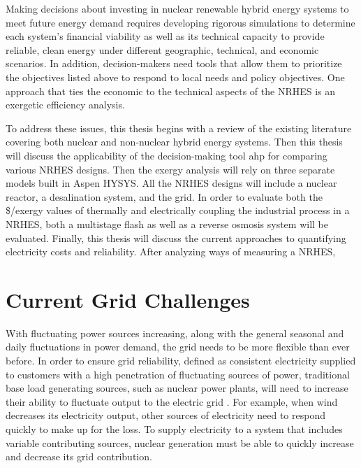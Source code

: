 \documentclass[12pt]{UIdahoMastersThesis}
\begin{document}
Making decisions about investing in nuclear renewable hybrid energy systems to meet future energy demand requires developing rigorous simulations to determine each system's financial viability as well as its technical capacity to provide reliable, clean energy under different geographic, technical, and economic scenarios. In addition, decision-makers need tools that allow them to prioritize the objectives listed above to respond to local needs and policy objectives. One approach that ties the economic to the technical aspects of the NRHES is an exergetic efficiency analysis.


To address these issues, this thesis begins with a review of the existing literature covering both nuclear and non-nuclear hybrid energy systems.  Then this thesis will discuss the applicability of the decision-making tool \ac{ahp} for comparing various NRHES designs.  Then the exergy analysis will rely on three separate models built in Aspen HYSYS. All the NRHES designs will include a nuclear reactor, a desalination system, and the grid. In order to evaluate both the \$/exergy values of thermally and electrically coupling the industrial process in a NRHES, both a multistage flash as well as a reverse osmosis system will be evaluated.
Finally, this thesis will discuss the current approaches to quantifying electricity costs and reliability. After analyzing ways of measuring a NRHES,
\section{Current Grid Challenges}
With fluctuating power sources increasing, along with the general seasonal and daily fluctuations in power demand, the grid needs to be more flexible than ever before. In order to ensure grid reliability, defined as consistent electricity supplied to customers with a high penetration of fluctuating sources of power, traditional base load generating sources, such as nuclear power plants, will need to increase their ability to fluctuate output to the electric grid \cite {Denholm2011}. For example, when wind decreases its electricity output, other sources of electricity need to respond quickly to make up for the loss. To supply electricity to a system that includes variable contributing sources, nuclear generation must be able to quickly increase and decrease its grid contribution.
\end{document}
